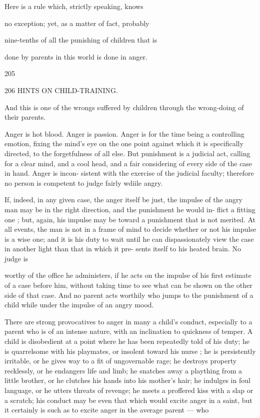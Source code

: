 \documentclass[
]{book}
\begin{document}
Here is a rule which, strictly speaking, knows

no exception; yet, as a matter of fact, probably

nine-tenths of all the punishing of children that is

done by parents in this world is done in anger.

205

206 HINTS ON CHILD-TRAINING.

And this is one of the wrongs suffered by children through the wrong-doing of their parents.

Anger is hot blood. Anger is passion. Anger is for the time being a controlling emotion, fixing the mind's eye on the one point against which it is specifically directed, to the forgetfulness of all else. But punishment is a judicial act, calling for a clear mind, and a cool head, and a fair considering of every side of the case in hand. Anger is incon- sistent with the exercise of the judicial faculty; therefore no person is competent to judge fairly wdiile angry.

If, indeed, in any given case, the anger itself be just, the impulse of the angry man may be in the right direction, and the punishment he would in- flict a fitting one ; but, again, his impulse may be toward a punishment that is not merited. At all events, the man is not in a frame of mind to decide whether or not his impulse is a wise one; and it is his duty to wait until he can dispassionately view the case in another light than that in which it pre- sents itself to his heated brain. No judge is

worthy of the office he administers, if he acts on the impulse of his first estimate of a case before him, without taking time to see what can be shown on the other side of that case. And no parent acts worthily who jumps to the punishment of a child while under the impulse of an angry mood.

There are strong provocatives to anger in many a child's conduct, especially to a parent who is of an intense nature, with an inclination to quickness of temper. A child is disobedient at a point where he has been repeatedly told of his duty; he is quarrelsome with his playmates, or insolent toward his nurse ; he is persistently irritable, or he gives way to a fit of ungovernable rage; he destroys property recklessly, or he endangers life and limb; he snatches away a plaything from a little brother, or he clutches his hands into his mother's hair; he indulges in foul language, or he utters threats of revenge; he meets a proffered kiss with a slap or a scratch; his conduct may be even that which would excite anger in a saint, but it certainly is such as to excite anger in the average parent --- who
\end{document}
